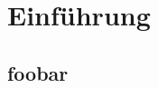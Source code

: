 \chapter{Einführung}
\label{chapter:Dokumentation-Einfuehrung}

\section{foobar}
\label{section:Dokumentation-Einfuehrung-foobar}
